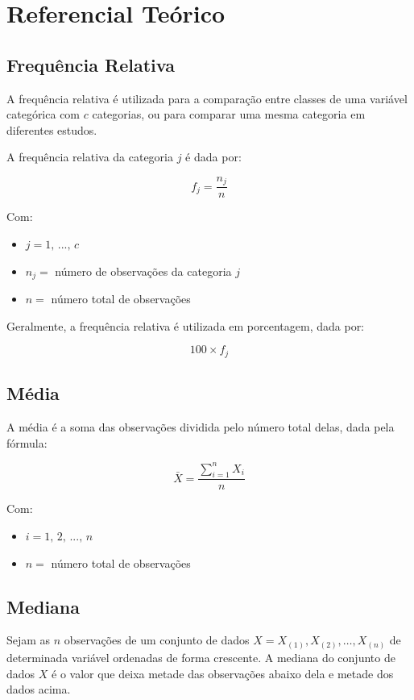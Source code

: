 \documentclass[
]{estat/estat}
\let\oldsection\section
\renewcommand\section{\clearpage\oldsection}
\begin{document}
\section{Referencial Teórico}\label{referencial-teuxf3rico}

\subsection{Frequência Relativa}\label{frequuxeancia-relativa}

A frequência relativa é utilizada para a comparação entre classes de uma
variável categórica com \(c\) categorias, ou para comparar uma mesma
categoria em diferentes estudos.

A frequência relativa da categoria \(j\) é dada por:

\[
f_j=\frac{n_j}{n}
\]

Com:

\begin{itemize}
\item
  \(j = 1, \, ..., \, c\)
\item
  \(n_j =\) número de observações da categoria \(j\)
\item
  \(n =\) número total de observações
\end{itemize}

Geralmente, a frequência relativa é utilizada em porcentagem, dada por:

\[100 \times f_j\]

\subsection{Média}\label{muxe9dia}

A média é a soma das observações dividida pelo número total delas, dada
pela fórmula:

\[\bar{X}=\frac{\sum\limits_{i=1}^{n}X_i}{n}\]

Com:

\begin{itemize}
\item
  \(i = 1, \, 2, \, ..., \, n\)
\item
  \(n =\) número total de observações
\end{itemize}

\subsection{Mediana}\label{mediana}

Sejam as \(n\) observações de um conjunto de dados
\(X=X_{(1)},X_{(2)},\ldots, X_{(n)}\) de determinada variável ordenadas
de forma crescente. A mediana do conjunto de dados \(X\) é o valor que
deixa metade das observações abaixo dela e metade dos dados acima.
\end{document}
